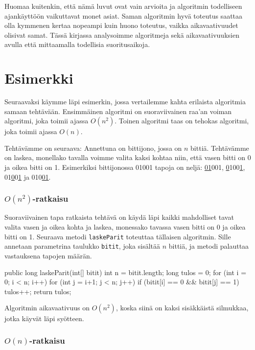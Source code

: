 Huomaa kuitenkin, että nämä luvut ovat vain arvioita ja algoritmin
todelliseen ajankäyttöön vaikuttavat monet asiat.
Saman algoritmin hyvä toteutus saattaa olla
kymmenen kertaa nopeampi kuin huono toteutus,
vaikka aikavaativuudet olisivat samat.
Tässä kirjassa analysoimme algoritmeja sekä aikavaativuuksien
avulla että mittaamalla todellisia suoritusaikoja.

\section{Esimerkki}

Seuraavaksi käymme läpi esimerkin, jossa vertailemme kahta
erilaista algoritmia samaan tehtävään.
Ensimmäinen algoritmi on suoraviivainen raa'an voiman
algoritmi, joka toimii ajassa $O(n^2)$.
Toinen algoritmi taas on tehokas algoritmi,
joka toimii ajassa $O(n)$.

Tehtävämme on seuraava: Annettuna on bittijono, jossa on $n$ bittiä.
Tehtävämme on laskea, monellako tavalla voimme valita kaksi kohtaa
niin, että vasen bitti on 0 ja oikea bitti on 1.
Esimerkiksi bittijonossa 01001 tapoja on neljä:
\underline{01}001, \underline{0}100\underline{1},
01\underline{0}0\underline{1} ja 010\underline{01}.

\subsubsection{$O(n^2)$-ratkaisu}

Suoraviivainen tapa ratkaista tehtävä on käydä läpi kaikki
mahdolliset tavat valita vasen ja oikea kohta ja laskea,
monessako tavassa vasen bitti on 0 ja oikea bitti on 1.
Seuraava metodi \texttt{laskeParit} toteuttaa tällaisen algoritmin.
Sille annetaan parametrina taulukko \texttt{bitit},
joka sisältää $n$ bittiä, ja metodi palauttaa vastauksena
tapojen määrän.

\begin{code}
public long laskeParit(int[] bitit) {
    int n = bitit.length;
    long tulos = 0;
    for (int i = 0; i < n; i++) {
        for (int j = i+1; j < n; j++) {
            if (bitit[i] == 0 && bitit[j] == 1) tulos++;
        }
    }
    return tulos;
}
\end{code}

Algoritmin aikavaativuus on $O(n^2)$, koska siinä on kaksi
sisäkkäistä silmukkaa, jotka käyvät läpi syötteen.

\subsubsection{$O(n)$-ratkaisu}

